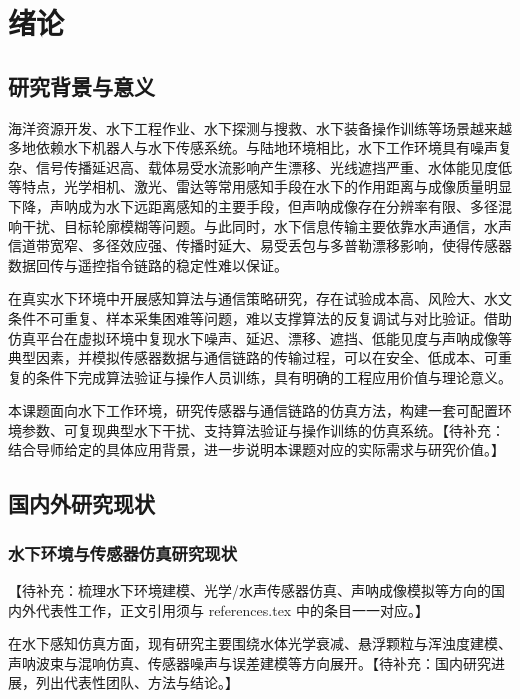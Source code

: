 
\chapter{绪论}

\section{研究背景与意义}

海洋资源开发、水下工程作业、水下探测与搜救、水下装备操作训练等场景越来越多地依赖水下机器人与水下传感系统。与陆地环境相比，水下工作环境具有噪声复杂、信号传播延迟高、载体易受水流影响产生漂移、光线遮挡严重、水体能见度低等特点，光学相机、激光、雷达等常用感知手段在水下的作用距离与成像质量明显下降，声呐成为水下远距离感知的主要手段，但声呐成像存在分辨率有限、多径混响干扰、目标轮廓模糊等问题\cite{ref1}。与此同时，水下信息传输主要依靠水声通信，水声信道带宽窄、多径效应强、传播时延大、易受丢包与多普勒漂移影响，使得传感器数据回传与遥控指令链路的稳定性难以保证\cite{ref2}。

在真实水下环境中开展感知算法与通信策略研究，存在试验成本高、风险大、水文条件不可重复、样本采集困难等问题，难以支撑算法的反复调试与对比验证。借助仿真平台在虚拟环境中复现水下噪声、延迟、漂移、遮挡、低能见度与声呐成像等典型因素，并模拟传感器数据与通信链路的传输过程，可以在安全、低成本、可重复的条件下完成算法验证与操作人员训练，具有明确的工程应用价值与理论意义\cite{ref3}。

本课题面向水下工作环境，研究传感器与通信链路的仿真方法，构建一套可配置环境参数、可复现典型水下干扰、支持算法验证与操作训练的仿真系统。【待补充：结合导师给定的具体应用背景，进一步说明本课题对应的实际需求与研究价值。】

\section{国内外研究现状}

\subsection{水下环境与传感器仿真研究现状}

【待补充：梳理水下环境建模、光学/水声传感器仿真、声呐成像模拟等方向的国内外代表性工作，正文引用须与 references.tex 中的条目一一对应。】

在水下感知仿真方面，现有研究主要围绕水体光学衰减、悬浮颗粒与浑浊度建模、声呐波束与混响仿真、传感器噪声与误差建模等方向展开\cite{ref1}。【待补充：国内研究进展，列出代表性团队、方法与结论。】

